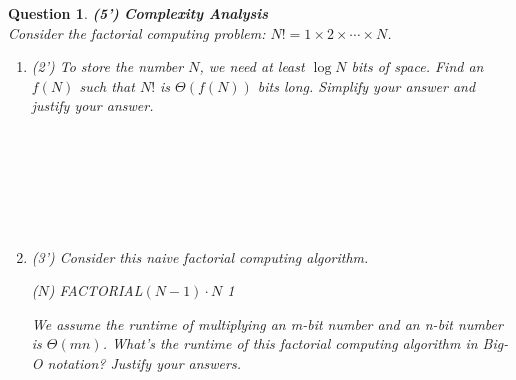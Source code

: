 \documentclass[10.5pt]{article}
\newtheorem{Q}{Question}
\begin{document}
\begin{Q}
\textbf{(5')} \textbf{Complexity Analysis}
\\
Consider the factorial computing problem: $N! = 1 \times 2 \times \cdots \times N $.
\begin{enumerate}
    \item (2') To store the number $N$, we need at least $\log N$ bits of space. Find an $f(N)$ such that $N!$ is $\Theta(f(N))$ bits long. Simplify your answer and justify your answer.
    \\
    \\
    \\
    \\
    \\
    \\
    \\
    \item (3') Consider this naive factorial computing algorithm.
        \algnewcommand{}
        \algnewcommand\RETURN{\State \algorithmicreturn}%
        \algnewcommand{}
        \algnewcommand\PROCEDURE{\item[\algorithmicprocedure]}%
        \algnewcommand{}
        \algnewcommand\ENDPROCEDURE{\item[\algorithmicendprocedure]}%
        \begin{algorithmic}
        ({$N$})
        \RETURN{} {{FACTORIAL}$(N-1) \cdot N$}
        \ELSE
        \RETURN{} 1
        \ENDIF

        \ENDPROCEDURE
        \end{algorithmic}
    We assume the runtime of multiplying an m-bit number and an n-bit number is $\Theta(mn)$.
    What's the runtime of this factorial computing algorithm in Big-O notation? Justify your answers.
        

\end{enumerate}

\end{Q}
	
\end{document}
